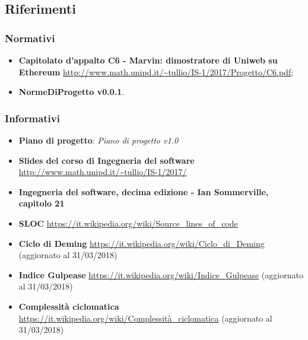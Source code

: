 \subsection{Riferimenti}
\subsubsection{Normativi}
\begin{itemize}
	\item
	\textbf{Capitolato d’appalto C6 - Marvin: dimostratore di Uniweb su Ethereum}
	\url{http://www.math.unipd.it/~tullio/IS-1/2017/Progetto/C6.pdf};
	\item
	\textbf{NormeDiProgetto v0.0.1}. 
\end{itemize}

\subsubsection{Informativi}
\begin{itemize}
	\item
	\textbf{Piano di progetto}: \emph{Piano di progetto v1.0}
	\item 
	\textbf{Slides del corso di Ingegneria del software} 
	\url{http://www.math.unipd.it/~tullio/IS-1/2017/}
	\item 
	\textbf{Ingegneria del software, decima edizione - Ian Sommerville, capitolo 21} 
	\item
	\textbf{SLOC}
	\url{https://it.wikipedia.org/wiki/Source_lines_of_code}
	\item
	\textbf{Ciclo di Deming}
	\url{https://it.wikipedia.org/wiki/Ciclo_di_Deming} (aggiornato al 31/03/2018)
	\item
	\textbf{Indice Gulpease}
	\url{https://it.wikipedia.org/wiki/Indice_Gulpease} (aggiornato al 31/03/2018)
	\item
	\textbf{Complessità ciclomatica}
	\url{https://it.wikipedia.org/wiki/Complessità_ciclomatica} (aggiornato al 31/03/2018)
\end{itemize}
